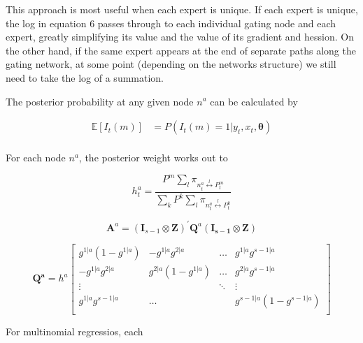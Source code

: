 \documentclass[12pt]{article}
\begin{document}
This approach is most useful when each expert is unique. If each expert is unique, the log in equation 6 passes through to each individual gating node and each expert, greatly simplifying its value and the value of its gradient and hession. On the other hand, if the same expert appears at the end of separate paths along the gating network, at some point (depending on the networks structure) we still need to take the log of a summation.

The posterior probability at any given node $n^{a}$ can be calculated by

\begin{equation} \label{eq:posteriorexpert}
  \begin{split}
    \mathbb{E}\left[I_{t}(m)\right] & = P(I_{t}(m)=1|y_{t},x_{t},\boldsymbol{\theta}) \\
  \end{split}
\end{equation}

For each node $n^{a}$, the posterior weight works out to

\begin{equation} \label{eq:posteriornode}
    h_{t}^{a} = \frac{P^{m}\sum_{l}\pi_{n^{a}_{t}\overset{l}{\longleftrightarrow} P^{m}_{t}}}{\sum_{k}P^{k}\sum_{l}\pi_{n^{a}_{t}\overset{l}{\longleftrightarrow} P^{k}_{t}}}
\end{equation}


\begin{equation} \label{eq:nodehessianQ}
  \mathbf{A}^{a} = (\mathbf{I}_{s-1} \otimes \mathbf{Z})^{\prime} \mathbf{Q}^{a} (\mathbf{I_{s-1}} \otimes \mathbf{Z})
\end{equation}

\begin{equation} \label{eq:}
  \mathbf{Q^{a}} = h^{a} \begin{bmatrix}
     g^{1|a}(1-g^{1|a}) & -g^{1|a}g^{2|a}    & \dots  & g^{1|a}g^{s-1|a}       \\
     -g^{1|a}g^{2|a}    & g^{2|a}(1-g^{1|a}) & \dots  & g^{2|a}g^{s-1|a}       \\
     \vdots             &                    & \ddots & \vdots                 \\
     g^{1|a}g^{s-1|a}   &  \dots             &        & g^{s-1|a}(1-g^{s-1|a}) \\
  \end{bmatrix}
\end{equation}

For multinomial regressios, each 
\end{document}
